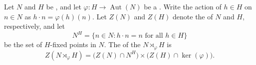 \begin{proposition} \label{proposition:center_of_semidirect_product}
    Let $N$ and $H$ be , and let $\varphi: H \to \operatorname{Aut}(N)$ be a . Write the action of $h \in H$ on $n \in N$ as $h \cdot n = \varphi(h)(n)$. Let $Z(N)$ and $Z(H)$ denote the  of $N$ and $H$, respectively, and let
    $$N^H = \{ n \in N : h \cdot n = n \text{ for all } h \in H \}$$
    be the set of $H$-fixed points in $N$. The  of the  $N \rtimes_\varphi H$ is
    $$Z(N \rtimes_\varphi H) = \bigl( Z(N) \cap N^H \bigr) \times \bigl( Z(H) \cap \ker(\varphi) \bigr).$$
\end{proposition}

